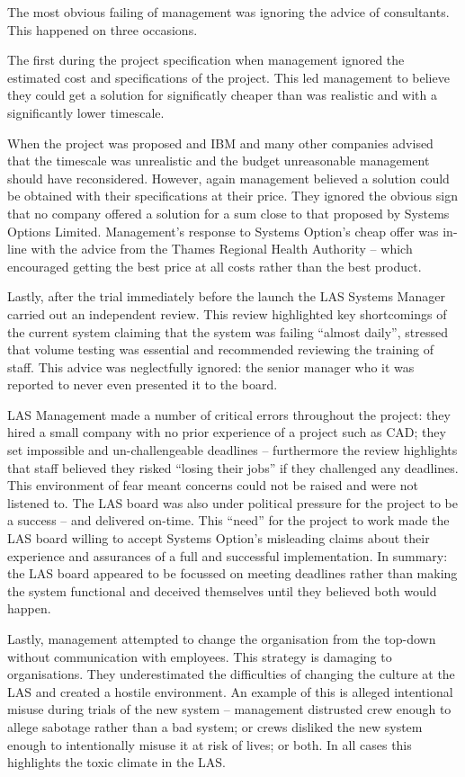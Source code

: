 \documentclass[10pt,\jkfside,a4paper]{article}
\begin{document}
\begin{enumerate}
\begin{enumerate}
\begin{enumerate}[label=(\roman*)]
The most obvious failing of management was ignoring the advice of consultants. This happened on three 
occasions. 

The first during the project specification when management ignored the estimated cost and 
specifications of the project. This led management to believe they could get a solution for significatly 
cheaper than was realistic and with a significantly lower timescale. 

When the project was proposed and 
IBM and many other companies advised that the timescale was unrealistic and the budget unreasonable 
management should have reconsidered. However, again management believed a solution could be obtained 
with their specifications at their price. They ignored the obvious sign that no company offered a 
solution for a sum close to that proposed by Systems Options Limited. Management's response to Systems 
Option's cheap offer was in-line with the advice from the Thames Regional Health Authority -- which 
encouraged getting the best price at all costs rather than the best product. 

Lastly, after the trial immediately 
before the launch the LAS Systems Manager carried out an independent review. This review highlighted key 
shortcomings of the current system claiming that the system was failing ``almost daily'', stressed 
that volume testing was essential and recommended reviewing the training of staff. This advice was 
neglectfully ignored: the senior manager who it was reported to never even presented it to the board.

LAS Management made a number of critical errors throughout the project: they hired a small company with 
no prior experience of a project such as CAD; they set impossible and un-challengeable deadlines -- 
furthermore the review highlights that staff believed they risked ``losing their jobs'' if they challenged 
any deadlines. This environment of fear meant concerns could not be raised and were not listened to. 
The LAS board was also under political 
pressure for the project to be a success -- and delivered on-time. This ``need'' for the project to work 
made the LAS board willing to accept Systems Option's misleading claims about their experience and 
assurances of a full and successful implementation. In summary: the LAS board appeared to be focussed 
on meeting deadlines rather than making the system functional and deceived themselves until they believed 
both would happen.

Lastly, management attempted to change the organisation from the top-down without communication with 
employees. This strategy is damaging to organisations. They underestimated the difficulties of changing 
the culture at the LAS and created a hostile environment. An example of this is alleged intentional misuse 
during trials of the new system -- management distrusted crew enough to allege sabotage rather than a bad 
system; or crews disliked the new system enough to intentionally misuse it at risk of lives; or both. In 
all cases this highlights the toxic climate in the LAS.


\end{enumerate}
\end{enumerate}
\end{enumerate}
\end{document}
